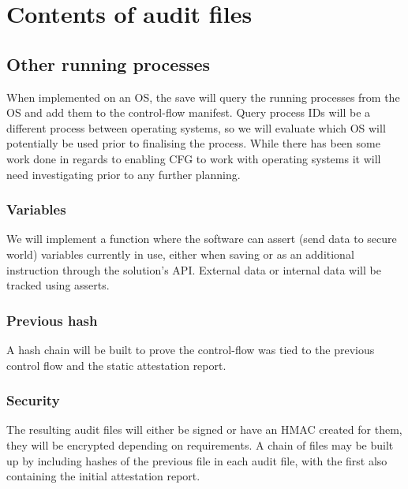 \section{Contents of audit files}

\subsection{Other running processes}

When implemented on an OS, the save will query the running processes from the OS and add them to the control-flow manifest. Query process IDs will be a different process between operating systems, so we will evaluate which OS will potentially be used prior to finalising the process. While there has been some work done in regards to enabling CFG to work with operating systems it will need investigating prior to any further planning.

\subsubsection{Variables}

We will implement a function where the software can assert (send data to secure world) variables currently in use, either when saving or as an additional instruction through the solution's API. External data or internal data will be tracked using asserts.

\subsubsection{Previous hash}

A hash chain will be built to prove the control-flow was tied to the previous control flow and the static attestation report.

\subsubsection{Security}

The resulting audit files will either be signed or have an HMAC created for them, they will be encrypted depending on requirements. A chain of files may be built up by including hashes of the previous file in each audit file, with the first also containing the initial attestation report.